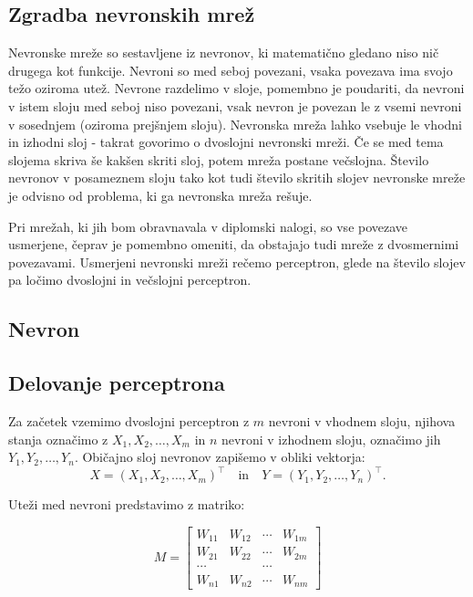 \documentclass[mat1]{fmfdelo}
\begin{document}


\subsection{Zgradba nevronskih mrež}
Nevronske mreže so sestavljene iz nevronov, ki matematično gledano niso nič drugega kot funkcije. Nevroni so med seboj povezani, vsaka povezava ima svojo težo oziroma utež. Nevrone razdelimo v sloje, pomembno je poudariti, da nevroni v istem sloju med seboj niso povezani, vsak nevron je povezan le z vsemi nevroni v sosednjem (oziroma prejšnjem sloju). Nevronska mreža lahko vsebuje le vhodni in izhodni sloj - takrat govorimo o dvoslojni nevronski mreži. Če se med tema slojema skriva še kakšen skriti sloj, potem mreža postane večslojna. Število nevronov v posameznem sloju tako kot tudi število skritih slojev nevronske mreže je odvisno od problema, ki ga nevronska mreža rešuje.


Pri mrežah, ki jih bom obravnavala v diplomski nalogi, so vse povezave usmerjene, čeprav je pomembno omeniti, da obstajajo tudi mreže z dvosmernimi povezavami. Usmerjeni nevronski mreži rečemo perceptron, glede na število slojev pa ločimo dvoslojni in večslojni perceptron.  

\subsection{Nevron}

\subsection{Delovanje perceptrona}
Za začetek vzemimo dvoslojni perceptron z $m$ nevroni v vhodnem sloju, njihova stanja  označimo z $X_1, X_2, \ldots, X_m$ in $n$ nevroni v izhodnem sloju, označimo jih $Y_1, Y_2, \ldots, Y_{n}$. Običajno sloj nevronov zapišemo v obliki vektorja:
\[ X = (X_1, X_2, \dotso, X_m)^\intercal  \quad \text{in} \quad  Y = (Y_1, Y_2, \dotso, Y_n)^\intercal \text{.}\]

Uteži med nevroni predstavimo z matriko:

\[ M = \begin{bmatrix}
W_{11} &W_{12}  & \cdots & W_{1m}  \\
W_{21}  &W_{22}  &\cdots & W_{2m}  \\
\cdots &  &\cdots &  \\
W_{n1} & W_{n2} & \cdots & W_{nm} 
\end{bmatrix}  \]
\end{document}
